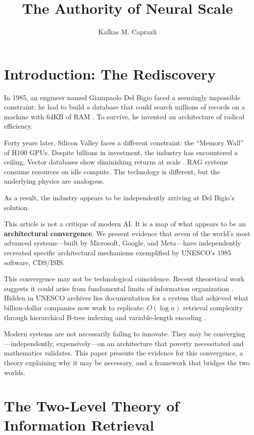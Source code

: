 \documentclass[manuscript,screen,nonacm]{acmart}
\title{The Authority of Neural Scale}
\author{Kafkas M. Caprazli}
\affiliation{%
  \institution{Independent Researcher}
  \city{Wolfsburg}
  \country{Germany}
}
\begin{document}
\maketitle

\section{Introduction: The Rediscovery}

In 1985, an engineer named Giampaolo Del Bigio faced a seemingly impossible constraint: he had to build a database that could search millions of records on a machine with 64KB of RAM \cite{delbigio1995}. To survive, he invented an architecture of radical efficiency.

Forty years later, Silicon Valley faces a different constraint: the ``Memory Wall'' of H100 GPUs. Despite billions in investment, the industry has encountered a ceiling. Vector databases show diminishing returns at scale \cite{bruckhaus2024}. RAG systems consume resources on idle compute. The technology is different, but the underlying physics are analogous.

As a result, the industry appears to be independently arriving at Del Bigio's solution.

This article is not a critique of modern AI. It is a map of what appears to be an \textbf{architectural convergence}. We present evidence that seven of the world's most advanced systems---built by Microsoft, Google, and Meta---have independently recreated specific architectural mechanisms exemplified by UNESCO's 1985 software, CDS/ISIS.

This convergence may not be technological coincidence. Recent theoretical work suggests it could arise from fundamental limits of information organization \cite{weller2025}. Hidden in UNESCO archives lies documentation for a system that achieved what billion-dollar companies now work to replicate: $O(\log n)$ retrieval complexity through hierarchical B-tree indexing and variable-length encoding \cite{unesco1989}.

Modern systems are not necessarily failing to innovate. They may be converging---independently, expensively---on an architecture that poverty necessitated and mathematics validates. This paper presents the evidence for this convergence, a theory explaining why it may be necessary, and a framework that bridges the two worlds.

\section{The Two-Level Theory of Information Retrieval}
\end{document}

